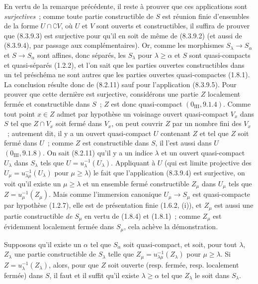 En vertu de la remarque précédente, il reste à prouver que ces applications
sont \emph{surjectives}~; comme toute partie constructible de $S$ est réunion
finie d'ensembles de la forme $U\cap\complement V$, où $U$ et $V$ sont
ouverts et constructibles, il suffira de prouver que (8.3.9.3) est surjective
pour qu'il en soit de même de (8.3.9.2) (et aussi de (8.3.9.4), par passage
aux complémentaires). Or, comme les morphismes $S_\lambda\to S_\alpha$ et
$S\to S_\alpha$ sont affines, donc séparés, les $S_\lambda$ pour
$\lambda\geq\alpha$ et $S$ sont quasi-compacts et quasi-séparés (1.2.2), et
l'on sait que les parties ouvertes constructibles dans un tel préschéma ne
sont autres que les parties ouvertes quasi-compactes (1.8.1). La conclusion
résulte donc de (8.2.11) sauf pour l'application (8.3.9.5). Pour prouver que
cette dernière est surjective, considérons une partie $Z$ localement fermée
et constructible dans $S$~; $Z$ est donc quasi-compact
$(0_{\mathrm{III}},9.1.4)$. Comme tout point $x\in Z$ admet par hypothèse un
voisinage ouvert quasi-compact $V_x$ dans $S$ tel que $Z\cap V_x$ soit fermé
dans $V_x$, on peut couvrir $Z$ par un nombre fini des $V_x$~; autrement dit,
il y a un ouvert quasi-compact $U$ contenant $Z$ et tel que $Z$ soit fermé
dans $U$~; comme $Z$ est constructible dans $S$, il l'est aussi dans $U$
$(0_{\mathrm{III}},9.1.8)$. On sait (8.2.11) qu'il y a un indice $\lambda$ et
un ouvert quasi-compact $U_\lambda$ dans $S_\lambda$ tels que
$U=u_\lambda^{-1}(U_\lambda)$. Appliquant à $U$ (qui est limite projective
des $U_\mu=u_{\lambda\mu}^{-1}(U_\lambda)$ pour $\mu\geq\lambda$) le fait
que l'application (8.3.9.4) est surjective, on voit qu'il existe un
$\mu\geq\lambda$ et un ensemble fermé constructible $Z_\mu$ dans $U_\mu$
tels que $Z=u_\mu^{-1}(Z_\mu)$. Mais comme l'immersion canonique
$U_\mu\to S_\mu$ est quasi-compacte par hypothèse (1.2.7), elle est de
présentation finie (1.6.2, (i)), et $Z_\mu$ est aussi une partie constructible
\emph{de} $S_\mu$ en vertu de (1.8.4) et (1.8.1)~; comme $Z_\mu$ est
évidemment localement fermée dans $S_\mu$, cela achève la démonstration.

\begin{corollary}[8.3.12]
\label{IV.8.3.12-fr}
Supposons qu'il existe un $\alpha$ tel que $S_\alpha$ soit quasi-compact, et
soit, pour tout $\lambda$, $Z_\lambda$ une partie constructible de
$S_\lambda$ telle que
$Z_\mu=u_{\lambda\mu}^{-1}(Z_\lambda)$ pour $\mu\geq\lambda$. Si
$Z=u_\lambda^{-1}(Z_\lambda)$,
alors, pour que $Z$ soit ouverte (resp. fermée, resp. localement fermée) dans
$S$, il faut et il suffit qu'il existe $\lambda\geq\alpha$ tel que
$Z_\lambda$ le soit dans $S_\lambda$.
\end{corollary}


